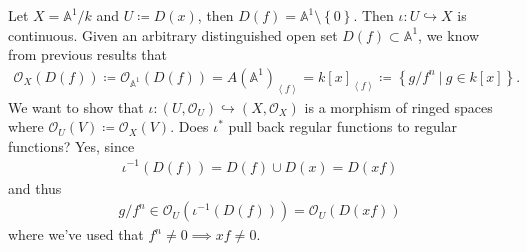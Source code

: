 \begin{example}

Let \(X = {\mathbb{A}}^1/k\) and \(U \coloneqq D(x)\), then
\(D(f) = {\mathbb{A}}^1\setminus\left\{{0}\right\}\). Then
\(\iota: U\hookrightarrow X\) is continuous. Given an arbitrary
distinguished open set \(D(f) \subset {\mathbb{A}}^1\), we know from
previous results that
\begin{align*}  
{\mathcal{O}}_X(D(f)) \coloneqq{\mathcal{O}}_{{\mathbb{A}}^1}(D(f)) = A({\mathbb{A}}^1)_{\left\langle{f}\right\rangle} = k[x]_{\left\langle{f}\right\rangle} \coloneqq\left\{{g/f^n {~\mathrel{\Big|}~}g\in k[x]}\right\}
.\end{align*}
We want to show that
\(\iota: (U, {\mathcal{O}}_U) \hookrightarrow(X, {\mathcal{O}}_X)\) is a
morphism of ringed spaces where
\({\mathcal{O}}_U(V) \coloneqq{\mathcal{O}}_X(V)\). Does \(\iota^*\)
pull back regular functions to regular functions? Yes, since
\begin{align*}
\iota^{-1} (D(f)) = D(f) \cup D(x) = D(xf)
\end{align*}
and thus
\begin{align*}
g/f^n \in {\mathcal{O}}_U(\iota^{-1}(D(f))) = {\mathcal{O}}_U(D(xf))
\end{align*}
where we've used that \(f^n \neq 0 \implies xf\neq 0\).

\end{example}

